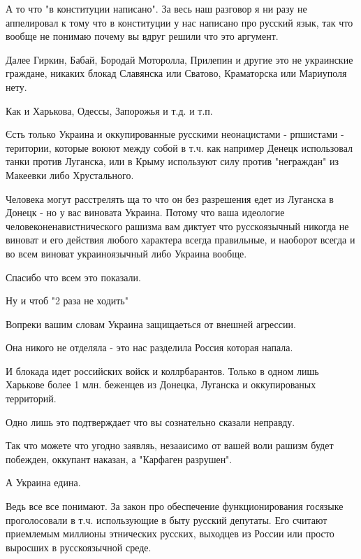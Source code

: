 \begin{itemize}
\begin{itemize}
А то что "в конституции написано". За весь наш разговор я ни разу не
аппелировал к тому что в конституции у нас написано про русский язык, так что
вообще не понимаю почему вы вдруг решили что это аргумент.

Далее Гиркин, Бабай, Бородай Моторолла, Прилепин и другие это не украинские
граждане, никаких блокад Славянска или Сватово, Краматорска или Мариуполя нету.

Как и Харькова, Одессы, Запорожья и т.д. и т.п.

Єсть только Украина и оккупированные русскими неонацистами - рпшистами -
територии, которые воюют между собой в т.ч. как например Денецк использовал
танки против Луганска, или в Крыму используют силу против "неграждан" из
Макеевки либо Хрустального.

Человека могут расстрелять ща то что он без разрешения едет из Луганска в
Донецк - но у вас виновата Украина. Потому что ваша идеологие
человеконенавистнического рашизма вам диктует что русскоязычный никогда не
виноват и его действия любого характера всегда правильные, и наоборот всегда и
во всем виноват украиноязычный либо Украина вообще.

Спасибо что всем это показали.

 

Ну и чтоб "2 раза не ходить"

Вопреки вашим словам Украина защищаеться от внешней агрессии.

Она никого не отделяла - это нас разделила Россия которая напала.

И блокада идет российских войск и коллрбарантов. Только в одном лишь Харькове
более 1 млн. беженцев из Донецка, Луганска и оккупированых территорий.

Одно лишь это подтверждает что вы сознательно сказали неправду.

Так что можете что угодно заявляь, незааисимо от вашей воли рашизм будет
побежден, оккупант наказан, а "Карфаген разрушен".

А Украина едина.

Ведь все все понимают. За закон про обеспечение функционирования госязыке
проголосовали в т.ч. использующие в быту русский депутаты. Его считают
приемлемым миллионы этнических русских, выходцев из России или просто выросших
в русскоязычной среде.


\end{itemize}
\end{itemize}

